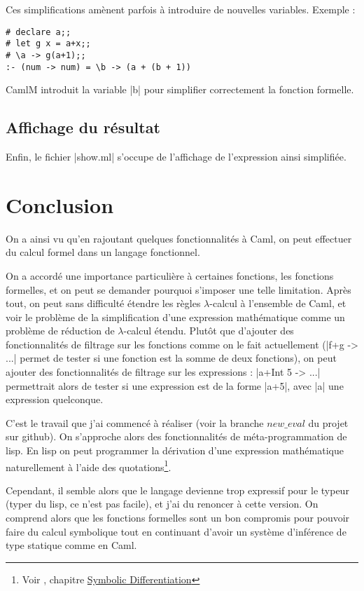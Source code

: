 \documentclass[a4paper, 12pt]{article}
\begin{document}
Ces simplifications amènent parfois à introduire de nouvelles variables.
Exemple : 
\begin{lstlisting}
# declare a;;
# let g x = a+x;;
# \a -> g(a+1);;
:- (num -> num) = \b -> (a + (b + 1))
\end{lstlisting}
CamlM introduit la variable |b| pour simplifier correctement la fonction formelle.
\subsection{Affichage du résultat}
Enfin, le fichier |show.ml| s'occupe de l'affichage de l'expression ainsi simplifiée.

\section{Conclusion}

On a ainsi vu qu'en rajoutant quelques fonctionnalités à Caml, on peut effectuer du calcul formel dans un langage fonctionnel. 

On a accordé une importance particulière à certaines fonctions, les fonctions formelles, et on peut se demander pourquoi s'imposer une telle limitation.
Après tout, on peut sans difficulté étendre les règles $\lambda$-calcul à l'ensemble de Caml, et voir le problème de la simplification d'une expression mathématique comme un problème de réduction de $\lambda$-calcul étendu.
Plutôt que d'ajouter des fonctionnalités de filtrage sur les fonctions comme on le fait actuellement (|f+g -> ...| permet de tester si une fonction est la somme de deux fonctions), on peut ajouter des fonctionnalités de filtrage sur les expressions : |a+Int 5 -> ...| permettrait alors de tester si une expression est de la forme |a+5|, avec |a| une expression quelconque.

C'est le travail que j'ai commencé à réaliser (voir la branche \href{https://github.com/robocop/CamlM/tree/feature/new_eval}{$new\_eval$} du projet sur github).
On s'approche alors des fonctionnalités de méta-programmation de lisp.
En lisp on peut programmer la dérivation d'une expression mathématique naturellement à l'aide des quotations\footnote{Voir \cite{SICP}, chapitre \href{http://mitpress.mit.edu/sicp/full-text/book/book-Z-H-16.html}{Symbolic Differentiation}}.

Cependant, il semble alors que le langage devienne trop expressif pour le typeur (typer du lisp, ce n'est pas facile), et j'ai du renoncer à cette version.
On comprend alors que les fonctions formelles sont un bon compromis pour pouvoir faire du calcul symbolique   
tout en continuant d'avoir un système d'inférence de type statique comme en Caml.
\end{document}
